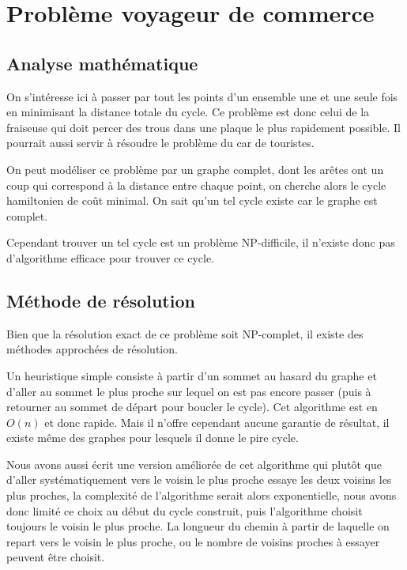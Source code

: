 \documentclass{scrartcl}
\begin{document}
\section{Problème voyageur de commerce} \label{sec:tsp}
  \subsection{Analyse mathématique}
    On s'intéresse ici à passer par tout les points d'un ensemble une et une
    seule fois en minimisant la distance totale du cycle. Ce problème est donc
    celui de la fraiseuse qui doit percer des trous dans une plaque le plus
    rapidement possible. Il pourrait aussi servir à résoudre le problème du car
    de touristes.

    On peut modéliser ce problème par un graphe complet, dont les arêtes ont un
    coup qui correspond à la distance entre chaque point, on cherche alors le
    cycle hamiltonien de coût minimal. On sait qu'un tel cycle existe car le
    graphe est complet.

    Cependant trouver un tel cycle est un problème NP-difficile, il n'existe
    donc pas d'algorithme efficace pour trouver ce cycle.

  \subsection{Méthode de résolution}
    Bien que la résolution exact de ce problème soit NP-complet, il existe des
    méthodes approchées de résolution.

    Un heuristique simple consiste à partir d'un sommet au hasard du graphe et
    d'aller au sommet le plus proche sur lequel on est pas encore passer (puis
    à retourner au sommet de départ pour boucler le cycle). Cet algorithme est
    en $O(n)$ et donc rapide. Mais il n'offre cependant aucune garantie de
    résultat, il existe même des graphes pour lesquels il donne le pire cycle.

    Nous avons aussi écrit une version améliorée de cet algorithme qui plutôt
    que d'aller systématiquement vers le voisin le plus proche essaye les deux
    voisins les plus proches, la complexité de l'algorithme serait alors
    exponentielle, nous avons donc limité ce choix au début du cycle construit,
    puis l'algorithme choisit toujours le voisin le plus proche. La longueur du
    chemin à partir de laquelle on repart vers le voisin le plus proche, ou le
    nombre de voisins proches à essayer peuvent être choisit.
\end{document}
